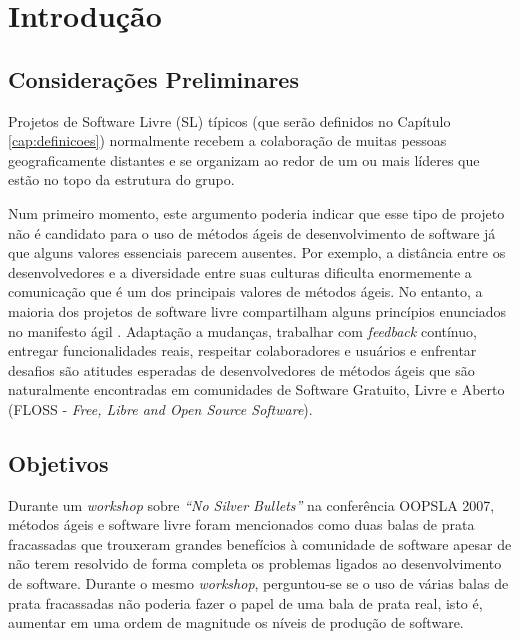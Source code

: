\chapter{Introdução}
\label{cap:introducao}

\section{Considerações Preliminares}
\label{sec:consideracoes_preliminares}

Projetos de Software Livre (SL) típicos (que serão definidos no
Capítulo \ref{cap:definicoes}) normalmente recebem a colaboração de
muitas pessoas geograficamente distantes \cite{Dempsey1999} e se
organizam ao redor de um ou mais líderes que estão no topo da
estrutura do grupo.

Num primeiro momento, este argumento poderia indicar que esse tipo de
projeto não é candidato para o uso de métodos ágeis de desenvolvimento
de software já que alguns valores essenciais parecem ausentes. Por
exemplo, a distância entre os desenvolvedores e a diversidade entre
suas culturas dificulta enormemente a comunicação que é um dos
principais valores de métodos ágeis. No entanto, a maioria dos
projetos de software livre compartilham alguns princípios enunciados
no manifesto ágil \cite{AgileManifesto}. Adaptação a mudanças,
trabalhar com \emph{feedback} contínuo, entregar funcionalidades
reais, respeitar colaboradores e usuários e enfrentar desafios são
atitudes esperadas de desenvolvedores de métodos ágeis que são
naturalmente encontradas em comunidades de Software Gratuito, Livre e
Aberto (FLOSS - \emph{Free, Libre and Open Source Software}).

\section{Objetivos}
\label{sec:objetivo}

Durante um \emph{workshop} \cite{OOPSLA07} sobre \emph{``No Silver
  Bullets''} \cite{Brooks1987} na conferência OOPSLA 2007, métodos
ágeis e software livre foram mencionados como duas balas de prata
fracassadas que trouxeram grandes benefícios à comunidade de software
apesar de não terem resolvido de forma completa os problemas ligados
ao desenvolvimento de software. Durante o mesmo \emph{workshop},
perguntou-se se o uso de várias balas de prata fracassadas não poderia
fazer o papel de uma bala de prata real, isto é, aumentar em uma ordem
de magnitude os níveis de produção de software.

